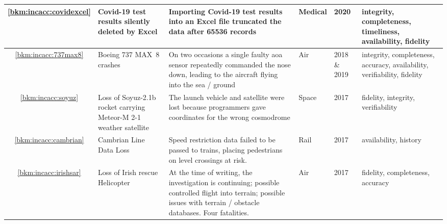\begin{longtable}{|C{}|L{}|L{}|L{}|L{}|L{}|}
    \hline
    \ref{bkm:incacc:covidexcel} & Covid-19 test results silently deleted by Excel &
    Importing Covid-19 test results into an Excel file truncated the data after 65536 records &
    Medical & 2020 & \Gls{integrity}, \gls{completeness}, \gls{timeliness}, \gls{availability}, \gls{fidelity}\\
    \hline
	\ref{bkm:incacc:737max8} & Boeing 737 MAX~8 crashes &
	On two occasions a single faulty \gls{aoa} sensor repeatedly commanded the nose down,
        leading to the aircraft flying into the sea / ground
	& Air & 2018 \& 2019 & \Gls{integrity}, \gls{completeness}, \gls{accuracy}, \gls{availability}, \gls{verifiability}, \gls{fidelity}\\ 
	\hline
    \ref{bkm:incacc:soyuz} & Loss of Soyuz-2.1b rocket carrying Meteor-M 2-1 weather satellite &
    The launch vehicle and satellite were lost because programmers gave coordinates for the wrong cosmodrome
    & Space & 2017 & \Gls{fidelity}, \gls{integrity}, \gls{verifiability} \\
    \hline
	\ref{bkm:incacc:cambrian} & Cambrian Line Data Loss &
	Speed restriction data failed to be passed to trains, placing pedestrians on level crossings at risk.
	& Rail & 2017 & \gls{availability}, \gls{history} \\ 
	\hline
	\ref{bkm:incacc:irishsar} & Loss of Irish rescue Helicopter & At the time of writing, the investigation is continuing; possible controlled flight into terrain; possible issues with terrain / obstacle \glspl{database}. Four fatalities. & Air & 2017 & \Gls{fidelity}, \gls{completeness}, \gls{accuracy} \\

\end{longtable}
